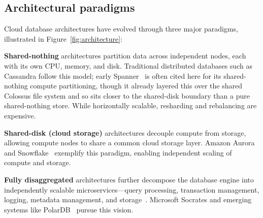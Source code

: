\documentclass[a4paper,fleqn]{cas-sc}
\begin{document}
\subsection{Architectural paradigms}
\label{subsec:architectures}

Cloud database architectures have evolved through three major paradigms, illustrated in Figure~\ref{fig:architecture}:

\textbf{Shared-nothing} architectures partition data across independent nodes, each with its own CPU, memory, and disk. Traditional distributed databases such as Cassandra follow this model; early Spanner~\cite{Corbett2013Spanner} is often cited here for its shared-nothing compute partitioning, though it already layered this over the shared Colossus file system and so sits closer to the shared-disk boundary than a pure shared-nothing store. While horizontally scalable, resharding and rebalancing are expensive.

\textbf{Shared-disk (cloud storage)} architectures decouple compute from storage, allowing compute nodes to share a common cloud storage layer. Amazon Aurora~\cite{Verbitski2017} and Snowflake~\cite{Dageville2016} exemplify this paradigm, enabling independent scaling of compute and storage.

\textbf{Fully disaggregated} architectures further decompose the database engine into independently scalable microservices---query processing, transaction management, logging, metadata management, and storage~\cite{Antonopoulos2019}. Microsoft Socrates and emerging systems like PolarDB~\cite{Cao2021PolarDB} pursue this vision.
\end{document}

